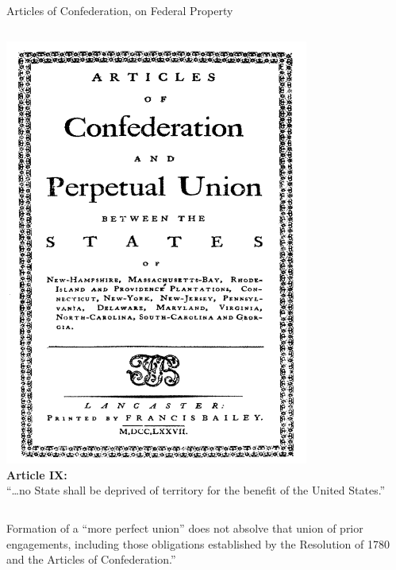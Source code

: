 \begin{frame}{Articles of Confederation, on Federal Property}
    \begin{columns}[c]
            \centering
            \includegraphics[width=0.75\textwidth]{img/articles-of-confederation.png} \\
            \textbf{Article IX:} \\
            ``\ldots no State shall be deprived of territory for the benefit of the United States.''
    \end{columns}
\end{frame}

\begin{frame}
    \begin{block}{}
        Formation of a ``more perfect union'' does not absolve that union of prior engagements, including those obligations established by the Resolution of 1780 and the Articles of Confederation.''
    \end{block}
\end{frame}


